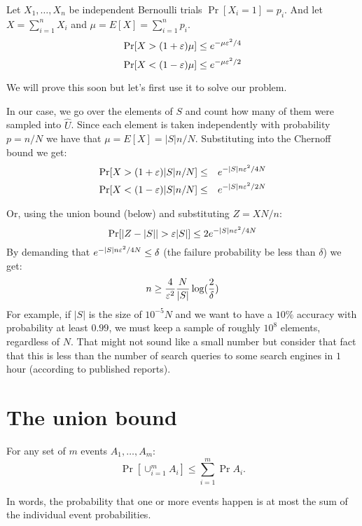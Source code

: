\documentclass{article}
\begin{document}
\begin{lemma}
Let $X_1,\ldots,X_n$ be independent Bernoulli trials $\Pr[X_i=1] = p_i$. 
And let $X = \sum_{i=1}^{n}X_i$ and $\mu = E[X] = \sum_{i=1}^{n}p_i$.
\begin{equation}
\Pr[X > (1 + \varepsilon)\mu] \le e^{-\mu \varepsilon^2/4}
\end{equation} 
\begin{equation}
\Pr[X < (1 - \varepsilon)\mu] \le e^{-\mu \varepsilon^2/2}
\end{equation} 
\end{lemma}
We will prove this soon but let's first use it to solve our problem.

In our case, we go over the elements of $S$ and count  
how many of them were sampled into $\hat{U}$.
Since each element is taken independently with probability $p = n/N$ we have that 
$\mu = E[X] = |S|n/N$. Substituting into the Chernoff bound we get:
\begin{eqnarray}
\Pr[X > (1+\varepsilon) |S|n/N] &\le& e^{-|S|n\varepsilon^2/4N}\\
\Pr[X < (1-\varepsilon) |S|n/N] &\le& e^{-|S|n\varepsilon^2/2N}
\end{eqnarray}

\noindent Or, using the union bound (below) and substituting  $Z = XN/n$:
\[
\Pr[\left| Z - |S| \right| > \varepsilon|S| ] \le 2 e^{-|S|n\varepsilon^2/4N}
\]
By demanding that $e^{-|S|n\varepsilon^2/4N} \le \delta$ (the failure probability be less than $\delta$) we get:
\[
n \ge \frac{4}{\varepsilon^2}\frac{N}{|S|}\log(\frac{2}{\delta})
\]
For example, if $|S|$ is the size of $10^{-5}N$ and we want to have a $10\%$ accuracy with probability at least $0.99$,
we must keep a sample of roughly $10^{8}$ elements, regardless of $N$. 
That might not sound like a small number but consider that fact that this is less than the number of search queries to some search engines in $1$ hour (according to published reports). 

\section{The union bound}
\begin{lemma}
For any set of $m$ events $A_1,\ldots,A_m$:
\[
\Pr[\cup_{i=1}^{m}A_i] \le \sum_{i=1}^{m}\Pr{A_i}.
\]
\end{lemma}
In words, the probability that one or more events happen is at most the sum of the 
individual event probabilities. 
\end{document}
